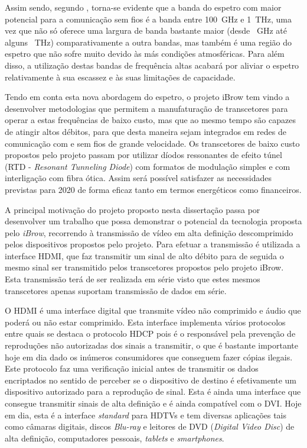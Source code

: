Assim sendo, segundo \cite{R005}, torna-se evidente que a banda do espetro com maior potencial para a comunicação sem fios é a banda entre \SI{100}{\giga\hertz} e \SI{1}{\tera\hertz}, uma vez que não só oferece uma largura de banda bastante maior (desde \SI{}{\giga\hertz} até alguns  \SI{}{\tera\hertz}) comparativamente a outra bandas, mas também é uma região do espetro que não sofre muito devido às más condições atmosféricas. Para além disso, a utilização destas bandas de frequência altas acabará por aliviar o espetro relativamente à sua escassez e às suas limitações de capacidade. 

Tendo em conta esta nova abordagem do espetro, o projeto iBrow tem vindo a desenvolver metodologias que permitem a manufaturação de transcetores para operar a estas frequências de baixo custo, mas que ao mesmo tempo são capazes de atingir altos débitos, para que desta maneira sejam integrados em redes de comunicação com e sem fios de grande velocidade. Os transcetores de baixo custo propostos pelo projeto passam por utilizar díodos ressonantes de efeito túnel (RTD - \textit{Resonant Tunneling Diode}) com formatos de modulação simples e com interligação com fibra ótica. Assim será possível satisfazer as necessidades previstas para 2020 de forma eficaz tanto em termos energéticos como financeiros.


A principal motivação do projeto proposto nesta dissertação passa por desenvolver um trabalho que possa demonstrar o potencial da tecnologia proposta pelo \textit{iBrow}, recorrendo à transmissão de vídeo em alta definição descomprimido pelos dispositivos propostos pelo projeto. Para efetuar a transmissão é utilizada a interface HDMI, que faz transmitir um sinal de alto débito para de seguida o mesmo sinal ser transmitido pelos transcetores propostos pelo projeto iBrow. Esta transmissão terá de ser realizada em série visto que estes mesmos transcetores apenas suportam transmissão de dados em série.

O HDMI é uma interface digital que transmite vídeo não comprimido e áudio que poderá ou não estar comprimido. Esta interface implementa vários protocolos entre quais se destaca o protocolo HDCP pois é o responsável pela prevenção de reproduções não autorizadas dos sinais a transmitir, o que é bastante importante hoje em dia dado os inúmeros consumidores que conseguem fazer cópias ilegais. Este protocolo faz uma verificação inicial antes de transmitir os dados encriptados no sentido de perceber se o dispositivo de destino é efetivamente um dispositivo autorizado para a reprodução de sinal. Esta é ainda uma interface que consegue transmitir sinais de alta definição e é ainda compatível com o DVI. Hoje em dia, esta é a interface \textit{standard} para HDTVs e tem diversas aplicações tais como câmaras digitais, discos \textit{Blu-ray} e leitores de DVD (\textit{Digital Video Disc}) de alta definição, computadores pessoais, \textit{tablets} e \textit{smartphones}.


